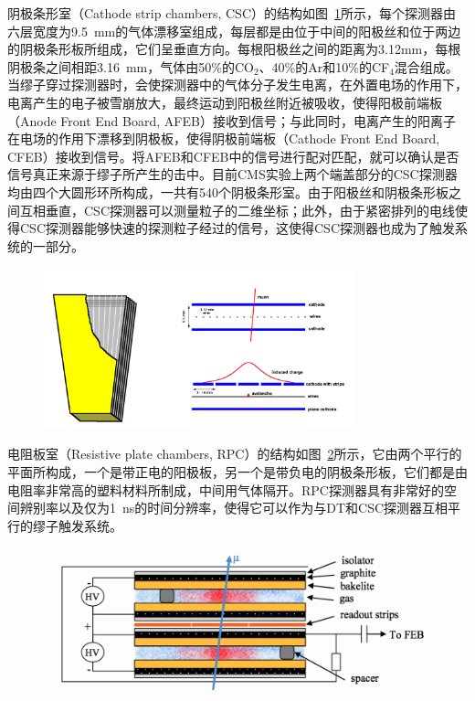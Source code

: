 阴极条形室（Cathode strip chambers, CSC）的结构如图~\ref{fig:c02f10}所示，每个探测器由六层宽度为9.5~\si{mm}的气体漂移室组成，每层都是由位于中间的阳极丝和位于两边的阴极条形板所组成，它们呈垂直方向。每根阳极丝之间的距离为3.12\si{mm}，每根阴极条之间相距3.16~\si{mm}，气体由50\%的CO$_2$、40\%的Ar和10\%的CF$_4$混合组成。当缪子穿过探测器时，会使探测器中的气体分子发生电离，在外置电场的作用下，电离产生的电子被雪崩放大，最终运动到阳极丝附近被吸收，使得阳极前端板（Anode Front End Board, AFEB）接收到信号；与此同时，电离产生的阳离子在电场的作用下漂移到阴极板，使得阴极前端板（Cathode Front End Board, CFEB）接收到信号。将AFEB和CFEB中的信号进行配对匹配，就可以确认是否信号真正来源于缪子所产生的击中。目前CMS实验上两个端盖部分的CSC探测器均由四个大圆形环所构成，一共有540个阴极条形室。由于阳极丝和阴极条形板之间互相垂直，CSC探测器可以测量粒子的二维坐标；此外，由于紧密排列的电线使得CSC探测器能够快速的探测粒子经过的信号，这使得CSC探测器也成为了触发系统的一部分。

\begin{figure}[!htbp]
    \centering
    \includegraphics[width=0.8\textwidth]{Thesis (Version 2246)/figures/chapter02/CSC.pdf}
    \label{fig:c02f10}
\end{figure}

电阻板室（Resistive plate chambers, RPC）的结构如图~\ref{fig:c02f11}所示，它由两个平行的平面所构成，一个是带正电的阳极板，另一个是带负电的阴极条形板，它们都是由电阻率非常高的塑料材料所制成，中间用气体隔开。RPC探测器具有非常好的空间辨别率以及仅为1~\si{ns}的时间分辨率，使得它可以作为与DT和CSC探测器互相平行的缪子触发系统。

\begin{figure}[!htbp]
    \centering
    \includegraphics[width=1.0\textwidth]{figures/chapter02/rpc-schema.png}
    \label{fig:c02f11}
\end{figure}

